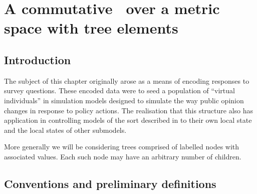 






\chapter{A commutative \rng\ over a metric space with tree elements}

\section{Introduction}
The subject of this chapter originally arose as a means of encoding
responses to survey questions. These encoded data were to seed a
population of ``virtual individuals'' in simulation models designed to
simulate the way public opinion changes in response to policy
actions. The realisation that this structure also has application in
controlling models of the sort described in 
to their own local state and the local states of other submodels.


More generally we will be considering trees comprised of labelled
nodes with associated values.  Each such node may have an arbitrary
number of children. 

\section{Conventions and preliminary definitions}

